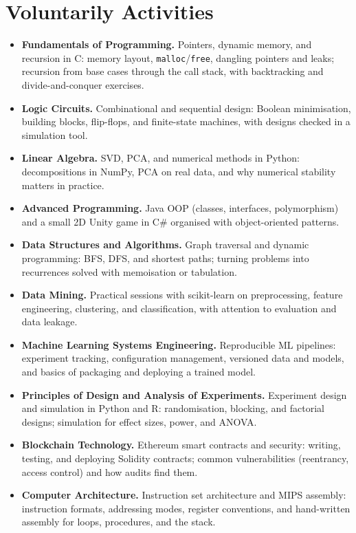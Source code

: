 \documentclass[11pt,a4paper]{article}
\newcommand{\subheader}[1]{%
  \vspace{0.35em}{\bfseries\normalsize #1}\par\vspace{0.2em}%
}
\begin{document}
\section*{Voluntarily Activities}

\vspace{0.25em}
\subheader{Workshops}
\begin{itemize}[itemsep=0.55em,topsep=0.35em]
  \item \textbf{Fundamentals of Programming.}
    Pointers, dynamic memory, and recursion in C: memory layout, \texttt{malloc}/\texttt{free}, dangling pointers and leaks; recursion from base cases through the call stack, with backtracking and divide-and-conquer exercises.
  \item \textbf{Logic Circuits.}
    Combinational and sequential design: Boolean minimisation, building blocks, flip-flops, and finite-state machines, with designs checked in a simulation tool.
  \item \textbf{Linear Algebra.}
    SVD, PCA, and numerical methods in Python: decompositions in NumPy, PCA on real data, and why numerical stability matters in practice.
  \item \textbf{Advanced Programming.}
    Java OOP (classes, interfaces, polymorphism) and a small 2D Unity game in C\# organised with object-oriented patterns.
  \item \textbf{Data Structures and Algorithms.}
    Graph traversal and dynamic programming: BFS, DFS, and shortest paths; turning problems into recurrences solved with memoisation or tabulation.
  \item \textbf{Data Mining.}
    Practical sessions with scikit-learn on preprocessing, feature engineering, clustering, and classification, with attention to evaluation and data leakage.
  \item \textbf{Machine Learning Systems Engineering.}
    Reproducible ML pipelines: experiment tracking, configuration management, versioned data and models, and basics of packaging and deploying a trained model.
  \item \textbf{Principles of Design and Analysis of Experiments.}
    Experiment design and simulation in Python and R: randomisation, blocking, and factorial designs; simulation for effect sizes, power, and ANOVA.
  \item \textbf{Blockchain Technology.}
    Ethereum smart contracts and security: writing, testing, and deploying Solidity contracts; common vulnerabilities (reentrancy, access control) and how audits find them.
  \item \textbf{Computer Architecture.}
    Instruction set architecture and MIPS assembly: instruction formats, addressing modes, register conventions, and hand-written assembly for loops, procedures, and the stack.
\end{itemize}
\end{document}
